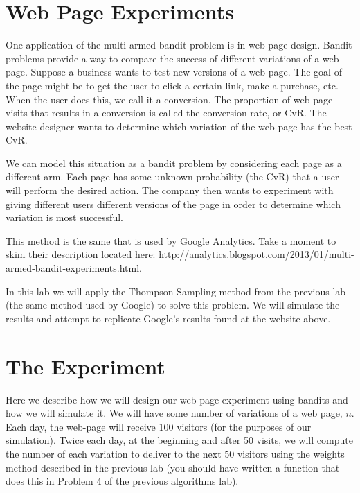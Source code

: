 
\section*{Web Page Experiments}
One application of the multi-armed bandit problem is in web page design.  
Bandit problems provide a way to compare the success of different variations of a web page.
Suppose a business wants to test new versions of a web page.  
The goal of the page might be to get the user to click a certain link, make a purchase, etc.  
When the user does this, we call it a conversion.  The proportion of web page visits 
that results in a conversion is called the conversion rate, or CvR.  
The website designer wants to determine which variation of the web page has the best CvR.

We can model this situation as a bandit problem by considering each page as a different arm. 
Each page has some unknown probability (the CvR) that a user will perform the desired action.
The company then wants to experiment with giving different users different versions of 
the page in order to determine which variation is most successful.

This method is the same that is used by Google Analytics.  Take a moment to skim their description located here:
\url{http://analytics.blogspot.com/2013/01/multi-armed-bandit-experiments.html}.

In this lab we will apply the Thompson Sampling method from the previous lab (the same method used by Google)
to solve this problem.  We will simulate the results and attempt to replicate Google's results found at the website above.

\section*{The Experiment}
Here we describe how we will design our web page experiment using bandits and how we will simulate it. 
We will have some number of variations of a web page, $n$.  Each day, the web-page will receive 100 visitors
(for the purposes of our simulation).  Twice each day, at the beginning and after 50 visits, 
we will compute the number of each variation to deliver to the next 50 visitors using the weights 
method described in the previous lab (you should have written a function that does this in Problem 4 
of the previous algorithms lab).

